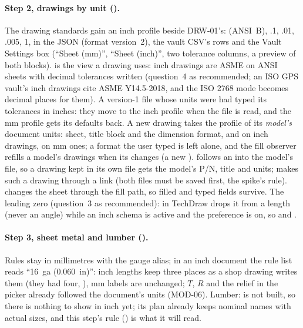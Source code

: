 \paragraph{Step 2, drawings by unit ().} The drawing standards gain an inch profile beside
DRW-01's:  (ANSI~B),  .1,  .01,
 .005,  1\textdegree, in the JSON (format version~2), the vault
CSV's  rows and the Vault Settings box (``Sheet (mm)'', ``Sheet (inch)'', two tolerance
columns, a preview of both blocks).  is the view a drawing
uses: inch drawings are ASME on ANSI sheets with decimal tolerances written  (question~4 as
recommended; an ISO GPS vault's inch drawings cite ASME Y14.5-2018, and the ISO 2768 mode becomes decimal
places for them). A version-1 file whose units were  had typed its tolerances in inches: they move to
the inch profile when the file is read, and the mm profile gets its defaults back. A new drawing takes the
profile of its \emph{model's} document units: sheet, title block and the dimension format,  and
 on inch drawings,  on mm ones; a format the user typed is left alone, and the fill
observer refills a model's drawings when its  changes (a new ).
 follows an  into the model's file, so a drawing kept in its own file gets the
model's P/N, title and units;  makes such a drawing through a link (both
files must be saved first, the spike's rule).  changes the sheet through the fill
path, so filled and typed fields survive. The leading zero (question~3 as recommended): \code{[BW]}
 in TechDraw drops it from a length (never an angle) while an inch
schema is active and the preference is on, so  and .

\paragraph{Step 3, sheet metal and lumber ().} Rules stay in millimetres with the gauge alias; in
an inch document the rule list reads ``16~ga (0.060~in)'': inch lengths keep three places as a shop drawing
writes them (they had four, ), mm labels are unchanged; $T$, $R$ and the relief in the picker
already followed the document's units (MOD-06). Lumber:  is not built, so there is nothing to
show in inch yet; its plan already keeps nominal names with actual sizes, and this step's rule
() is what it will read.

